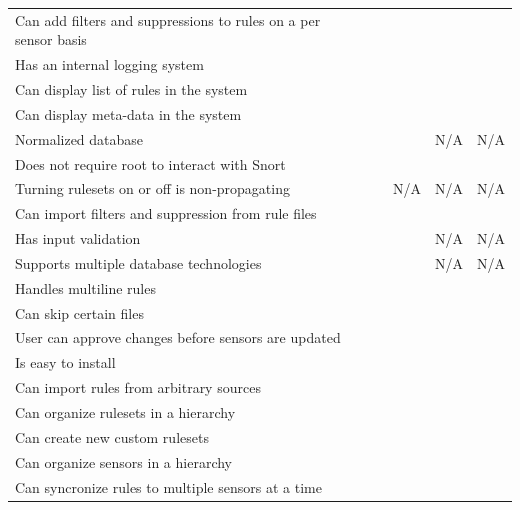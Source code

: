 \begin{longtable}{m|m|m|m|m|m}
	\multicolumn{1}{p{5cm}|}{Can add filters and suppressions to rules on a per sensor basis} & \checkmark & \checkmark &  & & \\
	\multicolumn{1}{p{5cm}|}{Has an internal logging system} & \checkmark & \checkmark & & & \\
	\multicolumn{1}{p{5cm}|}{Can display list of rules in the system} & \checkmark & \checkmark & & & \\
	\multicolumn{1}{p{5cm}|}{Can display meta-data in the system} & \checkmark &
	\checkmark & & & \\
	\multicolumn{1}{p{5cm}|}{Normalized database} & \checkmark &  & \checkmark &
	N/A & N/A
	\\
	\multicolumn{1}{p{5cm}|}{Does not require root to interact with Snort} & \checkmark & & & & \\
	\multicolumn{1}{p{5cm}|}{Turning rulesets on or off is non-propagating} &
	\checkmark & & N/A & N/A & N/A \\
	\multicolumn{1}{p{5cm}|}{Can import filters and suppression from rule files} &
	\checkmark &  & \checkmark & \checkmark & \checkmark \\
	\multicolumn{1}{p{5cm}|}{Has input validation} & \checkmark &  &  & N/A & N/A
	\\
	\multicolumn{1}{p{5cm}|}{Supports multiple database technologies} & \checkmark
	&  &  & N/A & N/A \\
	\multicolumn{1}{p{5cm}|}{Handles multiline rules} & \checkmark &  &
	& & \checkmark \\
	\multicolumn{1}{p{5cm}|}{Can skip certain files} & \checkmark & & \checkmark &
	& \checkmark \\
	\multicolumn{1}{p{5cm}|}{User can approve changes before sensors are updated} &
	\checkmark &  & & & \checkmark \\
	\multicolumn{1}{p{5cm}|}{Is easy to install} & \checkmark &  & & & \\
	\multicolumn{1}{p{5cm}|}{Can import rules from arbitrary sources} & \checkmark
	&  &  & & \\
	\multicolumn{1}{p{5cm}|}{Can organize rulesets in a hierarchy} & \checkmark & 
	& & &
	\\
	\multicolumn{1}{p{5cm}|}{Can create new custom rulesets} & \checkmark &  &  & & \\
	\multicolumn{1}{p{5cm}|}{Can organize sensors in a hierarchy} & \checkmark &  &
	& & \\
	\multicolumn{1}{p{5cm}|}{Can syncronize rules to multiple sensors at a time} & \checkmark &  &  & & \\

\end{longtable}
